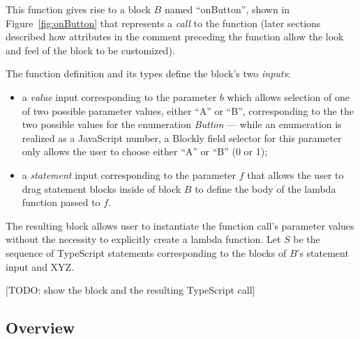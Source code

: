 This function gives rise to a 
block $B$ named ``onButton'', shown in Figure~\ref{fig:onButton}
that represents a \emph{call} to the function
(later sections described how attributes in the comment preceding
the function allow the look and feel of the block to be customized).

The function definition and its types define the block's two \emph{inputs}:
\begin{itemize}
\item  a \emph{value} input corresponding to the parameter
$b$ which allows selection of one of two 
possible parameter values, either ``A'' or ``B'', corresponding to the
the two possible values for the enumeration \emph{Button} ---
while an enumeration is realized as a JavaScript number, a 
Blockly field selector for this parameter only allows
the user to choose either ``A'' or ``B'' (0 or 1);
\item a \emph{statement} input corresponding to the parameter $f$
that allows the user to drag statement blocks inside of block $B$
to define the body of the lambda function passed to $f$.
\end{itemize}
The resulting block allows user to instantiate the function call's
parameter values without the necessity to explicitly create a 
lambda function.  Let $S$ be the sequence of TypeScript statements
corresponding to the blocks of $B$'s statement input and XYZ. 

[TODO: show the block and the resulting TypeScript call]



\subsection{Overview}





